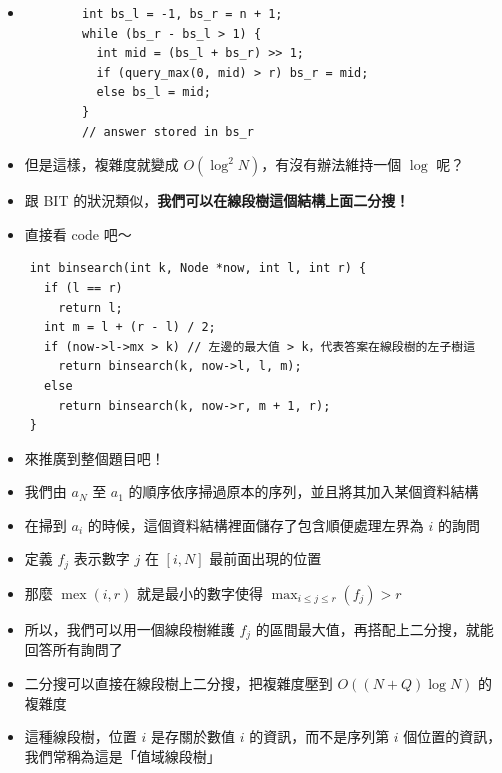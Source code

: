 \documentclass[standalone]{beamer}
\begin{document}
\begin{frame}[fragile]{}
  \begin{itemize}
    \item 
      \begin{verbatim}
        int bs_l = -1, bs_r = n + 1;
        while (bs_r - bs_l > 1) {
          int mid = (bs_l + bs_r) >> 1;
          if (query_max(0, mid) > r) bs_r = mid;
          else bs_l = mid;
        }
        // answer stored in bs_r
      \end{verbatim}
    \item 但是這樣，複雜度就變成 $O(\log^2 N)$，有沒有辦法維持一個 $\log$ 呢？
    \item 跟 BIT 的狀況類似，\textbf{我們可以在線段樹這個結構上面二分搜！}
    \item 直接看 code 吧～
  \end{itemize}
\end{frame}

\begin{frame}[fragile]{}
  \begin{verbatim}
    int binsearch(int k, Node *now, int l, int r) {
      if (l == r)
        return l;
      int m = l + (r - l) / 2;
      if (now->l->mx > k) // 左邊的最大值 > k，代表答案在線段樹的左子樹這
        return binsearch(k, now->l, l, m);
      else
        return binsearch(k, now->r, m + 1, r);
    }
  \end{verbatim}
\end{frame}

\begin{frame}[fragile]{}
  \begin{itemize}
    \item 來推廣到整個題目吧！
    \item 我們由 $a_N$ 至 $a_1$ 的順序依序掃過原本的序列，並且將其加入某個資料結構
    \item 在掃到 $a_i$ 的時候，這個資料結構裡面儲存了包含順便處理左界為 $i$ 的詢問
    \item 定義 $f_j$ 表示數字 $j$ 在 $[i, N]$ 最前面出現的位置
    \item 那麼 $\operatorname{mex}(i, r)$ 就是最小的數字使得 $\max_{i \leq j \leq r}(f_j) > r$
    \item 所以，我們可以用一個線段樹維護 $f_j$ 的區間最大值，再搭配上二分搜，就能回答所有詢問了
    \item 二分搜可以直接在線段樹上二分搜，把複雜度壓到 $O((N+Q)\log N)$ 的複雜度
    \item 這種線段樹，位置 $i$ 是存關於數值 $i$ 的資訊，而不是序列第 $i$ 個位置的資訊，我們常稱為這是「值域線段樹」
  \end{itemize}
\end{frame}
\end{document}
